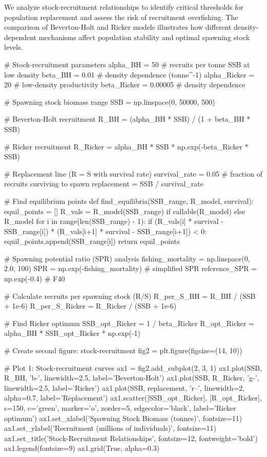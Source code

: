 \documentclass[a4paper, 11pt]{article}
\begin{document}
We analyze stock-recruitment relationships to identify critical thresholds for population
replacement and assess the risk of recruitment overfishing. The comparison of Beverton-Holt
and Ricker models illustrates how different density-dependent mechanisms affect population
stability and optimal spawning stock levels.

\begin{pycode}
# Stock-recruitment parameters
alpha_BH = 50  # recruits per tonne SSB at low density
beta_BH = 0.01  # density dependence (tonne^-1)
alpha_Ricker = 20  # low-density productivity
beta_Ricker = 0.00005  # density dependence

# Spawning stock biomass range
SSB = np.linspace(0, 50000, 500)

# Beverton-Holt recruitment
R_BH = (alpha_BH * SSB) / (1 + beta_BH * SSB)

# Ricker recruitment
R_Ricker = alpha_BH * SSB * np.exp(-beta_Ricker * SSB)

# Replacement line (R = S with survival rate)
survival_rate = 0.05  # fraction of recruits surviving to spawn
replacement = SSB / survival_rate

# Find equilibrium points
def find_equilibria(SSB_range, R_model, survival):
    equil_points = []
    R_vals = R_model(SSB_range) if callable(R_model) else R_model
    for i in range(len(SSB_range) - 1):
        if (R_vals[i] * survival - SSB_range[i]) * (R_vals[i+1] * survival - SSB_range[i+1]) < 0:
            equil_points.append(SSB_range[i])
    return equil_points

# Spawning potential ratio (SPR) analysis
fishing_mortality = np.linspace(0, 2.0, 100)
SPR = np.exp(-fishing_mortality)  # simplified SPR
reference_SPR = np.exp(-0.4)  # F40%

# Calculate recruits per spawning stock (R/S)
R_per_S_BH = R_BH / (SSB + 1e-6)
R_per_S_Ricker = R_Ricker / (SSB + 1e-6)

# Find Ricker optimum
SSB_opt_Ricker = 1 / beta_Ricker
R_opt_Ricker = alpha_BH * SSB_opt_Ricker * np.exp(-1)

# Create second figure: stock-recruitment
fig2 = plt.figure(figsize=(14, 10))

# Plot 1: Stock-recruitment curves
ax1 = fig2.add_subplot(2, 3, 1)
ax1.plot(SSB, R_BH, 'b-', linewidth=2.5, label='Beverton-Holt')
ax1.plot(SSB, R_Ricker, 'g-', linewidth=2.5, label='Ricker')
ax1.plot(SSB, replacement, 'r--', linewidth=2, alpha=0.7, label='Replacement')
ax1.scatter([SSB_opt_Ricker], [R_opt_Ricker], s=150, c='green', marker='o',
            zorder=5, edgecolor='black', label='Ricker optimum')
ax1.set_xlabel('Spawning Stock Biomass (tonnes)', fontsize=11)
ax1.set_ylabel('Recruitment (millions of individuals)', fontsize=11)
ax1.set_title('Stock-Recruitment Relationships', fontsize=12, fontweight='bold')
ax1.legend(fontsize=9)
ax1.grid(True, alpha=0.3)


\end{pycode}
\end{document}
